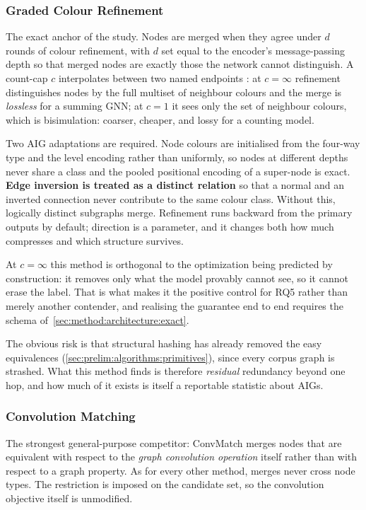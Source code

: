 \subsubsection{Graded Colour Refinement}
\label{sec:method:summary:wl}
The exact anchor of the study. Nodes are merged when they agree under $d$ rounds of colour
refinement, with $d$ set equal to the encoder's message-passing depth so that merged nodes
are exactly those the network cannot distinguish. A count-cap $c$ interpolates between two
named endpoints \citep{bollen2023exact}: at $c = \infty$ refinement distinguishes nodes by
the full multiset of neighbour colours and the merge is \emph{lossless} for a summing GNN\@;
at $c = 1$ it sees only the set of neighbour colours, which is bisimulation: coarser,
cheaper, and lossy for a counting model.

Two AIG adaptations are required. Node colours are initialised from the four-way type and
the level encoding rather than uniformly, so nodes at different depths never share a class
and the pooled positional encoding of a super-node is exact. \textbf{Edge inversion is
treated as a distinct relation} so that a normal and an inverted connection never
contribute to the same colour class. Without this, logically distinct subgraphs merge. Refinement runs backward from the primary outputs
by default; direction is a parameter, and it changes both how much compresses and which structure
survives.

At $c = \infty$ this method is orthogonal to the optimization being predicted by
construction: it removes only what the model provably cannot see, so it cannot erase the
label. That is what makes it the positive control for RQ5 rather than merely another
contender, and realising the guarantee end to end requires the schema
of~\ref{sec:method:architecture:exact}.

The obvious risk is that structural hashing has already removed the easy equivalences
(\ref{sec:prelim:algorithms:primitives}), since every corpus graph is strashed. What this
method finds is therefore \emph{residual} redundancy beyond one hop, and how much of it
exists is itself a reportable statistic about AIGs.


\subsubsection{Convolution Matching}
\label{sec:method:summary:convmatch}
The strongest general-purpose competitor: ConvMatch \citep{dickens2024convmatch} merges nodes
that are equivalent with respect to the \emph{graph convolution operation} itself rather than
with respect to a graph property. As for every other method, merges never cross node types.
The restriction is imposed on the candidate set, so the convolution objective itself is
unmodified.

